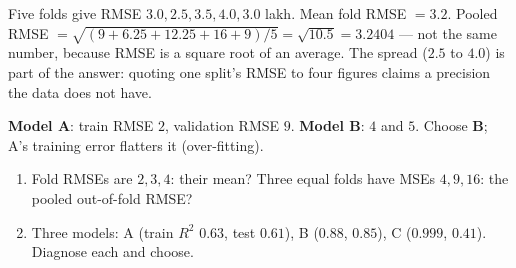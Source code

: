 \documentclass[11pt]{article}
\begin{document}
\begin{worked}
Five folds give RMSE $3.0, 2.5, 3.5, 4.0, 3.0$ lakh. Mean fold RMSE $= 3.2$.
Pooled RMSE $= \sqrt{(9 + 6.25 + 12.25 + 16 + 9)/5} = \sqrt{10.5} = 3.2404$
--- not the same number, because RMSE is a square root of an average. The
spread ($2.5$ to $4.0$) is part of the answer: quoting one split's RMSE to four
figures claims a precision the data does not have.

\textbf{Model A}: train RMSE $2$, validation RMSE $9$. \textbf{Model B}: $4$
and $5$. Choose \textbf{B}; A's training error flatters it (over-fitting).
\end{worked}

\begin{tryit}
\begin{enumerate}[label=\textbf{E21.\arabic*}]
  \item Fold RMSEs are $2, 3, 4$: their mean? Three equal folds have MSEs $4, 9,
    16$: the pooled out-of-fold RMSE?
  \item Three models: A (train $R^2$ $0.63$, test $0.61$), B ($0.88$, $0.85$),
    C ($0.999$, $0.41$). Diagnose each and choose.
\end{enumerate}
\end{tryit}
\end{document}
